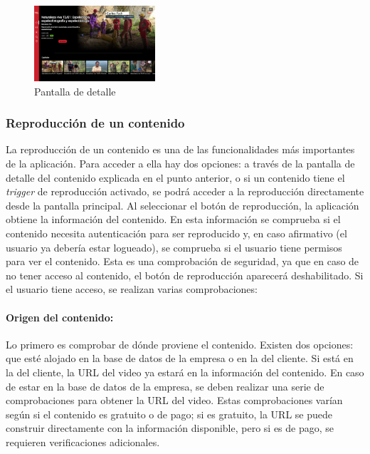 \begin{figure}[H]
    \includegraphics[width=0.4\textwidth]{imaxes/OTT/Pantalla_detalle_contenido.png}
    \caption{Pantalla de detalle}
\end{figure}

\subsubsection{Reproducción de un contenido}
\label{sec:reproduccion_contenido}

La reproducción de un contenido es una de las funcionalidades más importantes de la aplicación. Para acceder a ella hay dos opciones: a través de la pantalla de detalle 
del contenido explicada en el punto anterior, o si un contenido tiene el \textit{trigger} de reproducción activado, se podrá acceder a la reproducción directamente desde la pantalla 
principal. Al seleccionar el botón de reproducción, la aplicación obtiene la información del contenido. En esta información se comprueba si el contenido 
necesita autenticación para ser reproducido y, en caso afirmativo (el usuario ya debería estar logueado), se comprueba si el usuario tiene permisos para ver el contenido. 
Esta es una comprobación de seguridad, ya que en caso de no tener acceso al contenido, el botón de reproducción aparecerá deshabilitado. Si el usuario tiene acceso, 
se realizan varias comprobaciones:

\paragraph{Origen del contenido:} Lo primero es comprobar de dónde proviene el contenido. Existen dos opciones: que esté alojado en la base de datos de la empresa o 
en la del cliente. Si está en la del cliente, la URL del video ya estará en la información del contenido. En caso de estar en la base de datos de la empresa, se deben 
realizar una serie de comprobaciones para obtener la URL del video. Estas comprobaciones varían según si el contenido es gratuito o de pago; si es gratuito, la URL se puede 
construir directamente con la información disponible, pero si es de pago, se requieren verificaciones adicionales.

